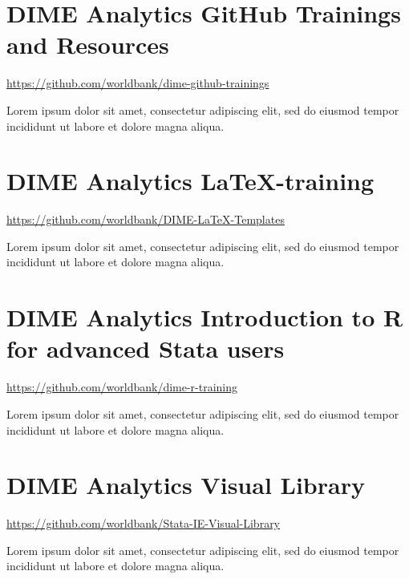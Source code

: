 
\filbreak
\section{DIME Analytics GitHub Trainings and Resources}
\url{https://github.com/worldbank/dime-github-trainings}
\vspace{\baselineskip}

\noindent Lorem ipsum dolor sit amet, consectetur adipiscing elit, sed do eiusmod tempor incididunt ut labore et dolore magna aliqua.


\filbreak
\section{DIME Analytics \LaTeX-training}
\url{https://github.com/worldbank/DIME-LaTeX-Templates}
\vspace{\baselineskip}

\noindent Lorem ipsum dolor sit amet, consectetur adipiscing elit, sed do eiusmod tempor incididunt ut labore et dolore magna aliqua.


\filbreak
\section{DIME Analytics Introduction to R for advanced Stata users}
\url{https://github.com/worldbank/dime-r-training}
\vspace{\baselineskip}

\noindent Lorem ipsum dolor sit amet, consectetur adipiscing elit, sed do eiusmod tempor incididunt ut labore et dolore magna aliqua.


\filbreak
\section{DIME Analytics Visual Library}
\url{https://github.com/worldbank/Stata-IE-Visual-Library}
\vspace{\baselineskip}

\noindent Lorem ipsum dolor sit amet, consectetur adipiscing elit, sed do eiusmod tempor incididunt ut labore et dolore magna aliqua.



\mainmatter
